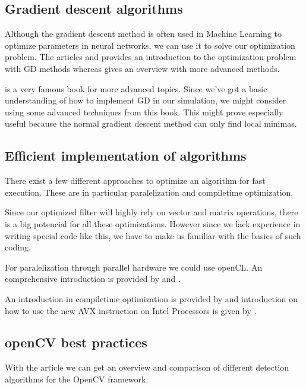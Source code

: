 \documentclass[titlepage, a4paper, 11pt]{scrartcl}
\begin{document}
\subsection{Gradient  descent  algorithms}

Although the gradient descent method is often used in Machine Learning to optimize parameters in neural networks, we can use it to solve our optimization problem.
The articles \citep{ketkar2017deep} and \citep{marti2005stochastic} provides an introduction to the optimization problem with GD methods whereas \citep{marti2005stochastic} gives an overview with more advanced methods.

\citep{bishop2006pattern} is a very famous book for more advanced topics. Since we've got a basic understanding of how to implement GD in our simulation, we might consider using 
some advanced techniques from this book. This might prove especially useful because the normal gradient descent method can only find local minimas.

\subsection{Efficient implementation  of  algorithms}

There exist a few different approaches to optimize an algorithm for fast execution. These are in particular paralelization and compiletime optimization.

Since our optimized filter will highly rely on vector and matrix operations, there is a big potencial for all these optimizations. However since we lack experience in
writing special code like this, we have to make us familiar with the basics of such coding.

For paralelization through parallel hardware we could use openCL. An comprehensive introduction is provided by \citep{trevett2013opencl} and \citep{tompson2012introduction}.

An introduction in compiletime optimization is provided by \citep{hohenauer2006retargetable} and introduction on how to use the new AVX instruction on Intel Processors is given by \citep{cornea2015intel}.


\subsection{openCV best practices}

With the article \citep{janku2016comparison} we can get an overview and comparison of different detection algorithms for the OpenCV framework.
\end{document}
